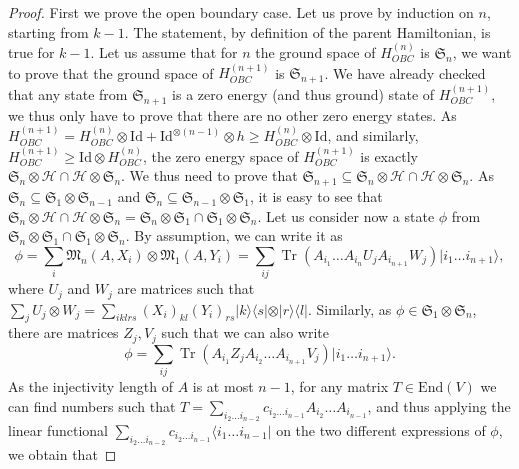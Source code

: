 \documentclass{article}
\newcommand{\tr}{\operatorname{Tr}}
\newcommand{\id}{\mathrm{Id}}
\newcommand{\End}{\mathrm{End}}
\newcommand{\ket}[1]{\vert #1 \rangle}
\newcommand{\bra}[1]{\langle #1 \vert}
\begin{document}
\begin{proof}
  First we prove the open boundary case. Let us prove by induction on $n$, starting from $k-1$. The statement, by definition of the parent Hamiltonian, is true for $k-1$. Let us assume that for $n$ the ground space of $H_{OBC}^{(n)}$ is $\mathfrak{S}_n$, we want to prove that the ground space of $H_{OBC}^{(n+1)}$ is $\mathfrak{S}_{n+1}$. We have already checked that any state from $\mathfrak{S}_{n+1}$ is a zero energy (and thus ground) state of $H_{OBC}^{(n+1)}$, we thus only have to prove that there are no other zero energy states. As $H_{OBC}^{(n+1)} = H_{OBC}^{(n)}\otimes\id + \id^{\otimes (n-1)}\otimes h \geq H_{OBC}^{(n)}\otimes \id$, and similarly, $H_{OBC}^{(n+1)}\geq \id\otimes H_{OBC}^{(n)}$, the zero energy space of $H_{OBC}^{(n+1)}$ is exactly $\mathfrak{S}_n\otimes \mathcal{H}\cap \mathcal{H} \otimes \mathfrak{S}_n$.
  We thus need to prove that  $\mathfrak{S}_{n+1}\subseteq \mathfrak{S}_n\otimes \mathcal{H}\cap \mathcal{H} \otimes \mathfrak{S}_n$. As $\mathfrak{S}_n\subseteq \mathfrak{S}_{1} \otimes \mathfrak{S}_{n-1}$ and $\mathfrak{S}_{n}\subseteq \mathfrak{S}_{n-1} \otimes \mathfrak{S}_{1}$, it is easy to see that $\mathfrak{S}_n\otimes \mathcal{H}\cap \mathcal{H} \otimes \mathfrak{S}_n = \mathfrak{S}_n\otimes \mathfrak{S}_1\cap \mathfrak{S}_1 \otimes \mathfrak{S}_n$. Let us consider now a state $\phi$ from $\mathfrak{S}_n\otimes \mathfrak{S}_1\cap \mathfrak{S}_1 \otimes \mathfrak{S}_n$. By assumption, we can write it as 
  \begin{equation*}
    \phi = \sum_i \mathfrak{M}_n(A,X_i) \otimes \mathfrak{M}_1(A,Y_i) = \sum_{ij} \tr(A_{i_1} \dots A_{i_n} U_j A_{i_{n+1}} W_j) \ket{i_1 \dots i_{n+1}},
  \end{equation*}
  where $U_j$ and $W_j$ are matrices such that $\sum_j U_j \otimes W_j = \sum_{iklrs} (X_{i})_{kl} (Y_i)_{rs} \ket{k}\bra{s} \otimes \ket{r}\bra{l}$. Similarly, as $\phi\in \mathfrak{S}_1 \otimes \mathfrak{S}_n$, there are matrices $Z_j,V_j$ such that we can also write
  \begin{equation*}
    \phi = \sum_{ij} \tr(A_{i_1} Z_j A_{i_2} \dots A_{i_{n+1}} V_j) \ket{i_1 \dots i_{n+1}}.
  \end{equation*}
  As the injectivity length of $A$ is at most $n-1$, for any matrix $T\in \End(V)$ we can find numbers such that $T = \sum_{i_2 \dots i_{n-2}}c_{i_2 \dots i_{n-1}}A_{i_2 } \dots A_{i_{n-1}}$, and thus applying the linear functional $\sum_{i_2 \dots i_{n-2}}c_{i_2 \dots i_{n-1}} \bra{i_1 \dots i_{n-1}}$ on the two different expressions of $\phi$, we obtain that 

\end{proof}
\end{document}
